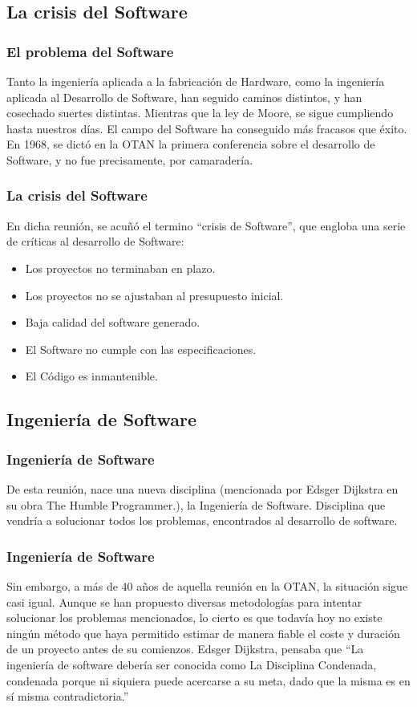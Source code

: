 \documentclass[12pt]{beamer}
\begin{document}
\subsection{La crisis del Software}
\begin{frame}
 \frametitle{El problema del Software}
Tanto la ingeniería aplicada a la fabricación de Hardware, como la ingeniería aplicada al Desarrollo de Software, han seguido caminos 
distintos, y han cosechado suertes distintas. Mientras que la ley de Moore, se sigue cumpliendo hasta nuestros días. El campo del Software 
ha conseguido más fracasos que éxito. En 1968, se dictó en la OTAN la primera conferencia sobre el desarrollo de Software, y no fue 
precisamente, por camaradería.
\end{frame}


\begin{frame}
 \frametitle{La crisis del Software}
En dicha reunión, se acuñó el termino \alert{``crisis de Software''}, que engloba una serie de críticas al desarrollo de Software:
\begin{itemize}
 \item<2-> Los proyectos no terminaban en plazo.
 \item<3-> Los proyectos no se ajustaban al presupuesto inicial.
 \item<4-> Baja calidad del software generado.
 \item<5-> El Software no cumple con las especificaciones.
 \item<6-> El Código es inmantenible.
\end{itemize}
\end{frame}

\subsection{Ingeniería de Software}
\begin{frame}
 \frametitle{Ingeniería de Software}
De esta reunión, nace una nueva disciplina (mencionada por Edsger Dijkstra en su obra The Humble Programmer.), la 
\alert{Ingeniería de Software}. Disciplina que vendría a solucionar todos los problemas, encontrados al desarrollo de software.
\end{frame}

\begin{frame}
 \frametitle{Ingeniería de Software}
Sin embargo, a más de 40 años de aquella reunión en la OTAN, la situación sigue casi igual. Aunque se han propuesto diversas 
metodologías  para intentar solucionar los problemas mencionados, lo cierto es que todavía hoy no existe ningún método que haya 
permitido estimar de manera fiable el coste y duración de un proyecto antes de su comienzos. Edsger Dijkstra, pensaba que 
``La ingeniería de software debería ser conocida como \alert{La Disciplina Condenada}, condenada porque ni siquiera puede acercarse a su meta, 
dado que la misma es en sí misma contradictoria.''
\end{frame}
\end{document}
